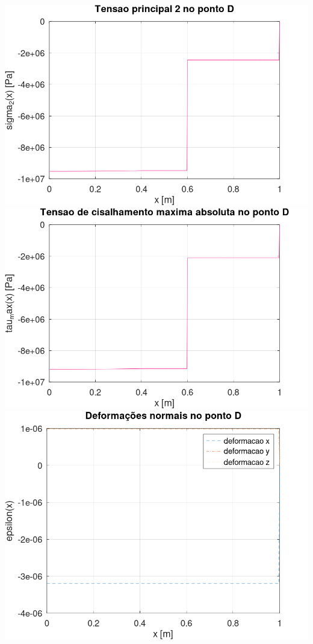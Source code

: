 \documentclass[10pt]{article}
\begin{document}
\begin{center}
    \includegraphics[scale=0.25]{figure40.png}
    \includegraphics[scale=0.25]{figure41.png}
    \includegraphics[scale=0.25]{figure42.png}

\end{center}
\end{document}
